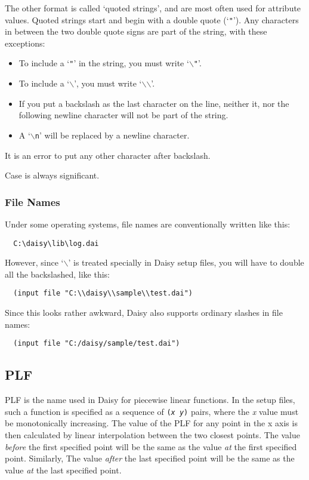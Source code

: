 The other format is called `quoted strings', and are most often used
for attribute values.  Quoted strings start and begin with a double
quote (`\texttt{"}').  Any characters in between the two double quote
signs are part of the string, with these exceptions:
\begin{itemize}
\item To include a `\texttt{"}' in the string, you must write
  `\texttt{\mbox{$\backslash$}"}'.
\item To include a `\texttt{\mbox{$\backslash$}}', you must write
  `\texttt{\mbox{$\backslash$}\mbox{$\backslash$}}'.
\item If you put a backslash as the last character on the line,
  neither it, nor the following newline character will not be part of
  the string.
\item A `\texttt{\mbox{$\backslash$}n}' will be replaced by a newline
  character. 
\end{itemize}
It is an error to put any other character after backslash.  

Case is always significant.
\subsubsection{File Names}

Under some operating systems,  file names are conventionally written
like this:
\begin{verbatim}
  C:\daisy\lib\log.dai
\end{verbatim}

However, since `\texttt{\mbox{$\backslash$}}' is treated specially in
Daisy setup files, you will have to double all the backslashed, like
this:
\begin{verbatim}
  (input file "C:\\daisy\\sample\\test.dai")
\end{verbatim}

Since this looks rather awkward, Daisy also supports ordinary slashes
in file names:
\begin{verbatim}
  (input file "C:/daisy/sample/test.dai")
\end{verbatim}

\subsection{PLF}
\label{type:plf}

PLF is the name used in Daisy for piecewise linear functions.  In the
setup files, such a function is specified as a sequence of
\texttt{(\emph{x} \emph{y})} pairs, where the \emph{x} value must be
monotonically increasing.  The value of the PLF for any point in the x
axis is then calculated by linear interpolation between the two
closest points.  The value \emph{before} the first specified point
will be the same as the value \emph{at} the first specified point.
Similarly, The value \emph{after} the last specified point will be the
same as the value \emph{at} the last specified point.

